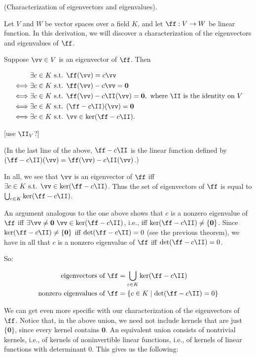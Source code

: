 \begin{deriv}
    (Characterization of eigenvectors and eigenvalues).

    Let $V$ and $W$ be vector spaces over a field $K$, and let $\ff:V \rightarrow W$ be linear function. In this derivation, we will discover a characterization of the eigenvectors and eigenvalues of $\ff$.
    
    Suppose $\vv \in V$ is an eigenvector of $\ff$. Then
    
    \begin{align*}
        &\exists c \in K \st \ff(\vv) = c \vv \\
        \iff &\exists c \in K \st \ff(\vv) - c \vv = \mathbf{0} \\
        \iff &\exists c \in K \st \ff(\vv) - c\II(\vv) = \mathbf{0}, \text{ where $\II$ is the identity on $V$} \\
        \iff &\exists c \in K \st (\ff - c\II)(\vv) = \mathbf{0} \\
        \iff &\exists c \in K \st \vv \in \ker(\ff - c\II).
    \end{align*}

    [use $\II_V$?]
    
    (In the last line of the above, $\ff - c\II$ is the linear function defined by $(\ff - c\II)(\vv) = \ff(\vv) - c\II(\vv)$.)
    
    In all, we see that $\vv$ is an eigenvector of $\ff$ iff $\exists c \in K \st \vv \in \ker(\ff - c \II)$. Thus the set of eigenvectors of $\ff$ is equal to $\bigcup_{c \in K} \ker(\ff - c \II)$.
    
    An argument analogous to the one above shows that $c$ is a nonzero eigenvalue of $\ff$ iff ${\exists \vv \neq \mathbf{0} 
    \spc \vv \in \ker(\ff - c \II)}$, i.e., iff $\ker(\ff - c\II) \neq \{\mathbf{0}\}$. Since $\ker(\ff - c\II) \neq \{\mathbf{0}\}$ iff $\det(\ff - c\II) = 0$ (see the previous theorem), we have in all that $c$ is a nonzero eigenvalue of $\ff$ iff $\det(\ff - c \II) = 0$.
    
    So:
    
    \begin{align*}
        \text{eigenvectors of $\ff$} &= \bigcup_{c \in K} \ker(\ff - c \II) \\
        \text{nonzero eigenvalues of $\ff$} &= \{ c \in K \mid \det(\ff - c \II) = 0 \}
    \end{align*}
    
    We can get even more specific with our characterization of the eigenvectors of $\ff$. Notice that, in the above union, we need not include kernels that are just $\{\mathbf{0}\}$, since every kernel contains $\mathbf{0}$. An equivalent union consists of nontrivial kernels, i.e., of kernels of noninvertible linear functions, i.e., of kernels of linear functions with determinant $0$. This gives us the following:
    

\end{deriv}
